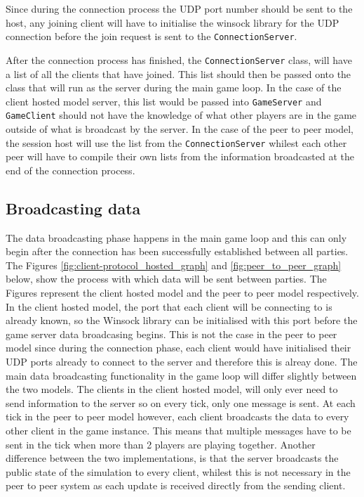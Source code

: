 Since during the connection process the UDP port number should be sent to the host, any joining client will have to initialise the winsock library for the UDP connection before the join request is sent to the \lstinline{ConnectionServer}.

After the connection process has finished, the \lstinline{ConnectionServer} class, will have a list of all the clients that have joined. This list should then be passed onto the class that will run as the server during the main game loop. In the case of the client hosted model server, this list would be passed into \lstinline{GameServer} and \lstinline{GameClient} should not have the knowledge of what other players are in the game outside of what is broadcast by the server. In the case of the peer to peer model, the session host will use the list from the \lstinline{ConnectionServer} whilest each other peer will have to compile their own lists from the information broadcasted at the end of the connection process.



\newpage


\subsection{Broadcasting data}
The data broadcasting phase happens in the main game loop and this can only begin after the connection has been successfully established between all parties. The Figures \ref{fig:client-protocol_hosted_graph} and \ref{fig:peer_to_peer_graph} below, show the process with which data will be sent between parties. The Figures represent the client hosted model and the peer to peer model respectively.
In the client hosted model, the port that each client will be connecting to is already known, so the Winsock library can be initialised with this port before the game server data broadcasing begins. This is not the case in the peer to peer model since during the connection phase, each client would have initialised their UDP ports already to connect to the server and therefore this is alreay done. The main data broadcasting functionality in the game loop will differ slightly between the two models. The clients in the client hosted model, will only ever need to send information to the server so on every tick, only one message is sent. At each tick in the peer to peer model however, each client broadcasts the data to every other client in the game instance. This means that multiple messages have to be sent in the tick when more than 2 players are playing together.
Another difference between the two implementations, is that the server broadcasts the public state of the simulation to every client, whilest this is not necessary in the peer to peer system as each update is received directly from the sending client.

